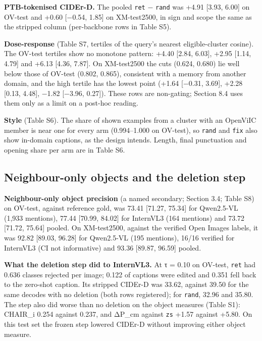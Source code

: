 \textbf{PTB-tokenised CIDEr-D.} The pooled \texttt{ret} − \texttt{rand} was +4.91 {[}3.93, 6.00{]}
on OV-test and +0.60 {[}−0.54, 1.85{]} on XM-test2500, in sign and scope the same as the stripped
column (per-backbone rows in Table S5).

\textbf{Dose-response} (Table S7, tertiles of the query's nearest eligible-cluster cosine). The
OV-test tertiles show no monotone pattern: +4.40 {[}2.84, 6.03{]}, +2.95 {[}1.14, 4.79{]} and +6.13
{[}4.36, 7.87{]}. On XM-test2500 the cuts (0.624, 0.680) lie well below those of OV-test (0.802,
0.865), consistent with a memory from another domain, and the high tertile has the lowest point
(+1.64 {[}−0.31, 3.69{]}, +2.28 {[}0.13, 4.48{]}, −1.82 {[}−3.96, 0.27{]}). These rows are
non-gating; Section 8.4 uses them only as a limit on a post-hoc reading.

\textbf{Style} (Table S6). The share of shown examples from a cluster with an OpenViIC member is
near one for every arm (0.994--1.000 on OV-test), so \texttt{rand} and \texttt{fix} also show
in-domain captions, as the design intends. Length, final punctuation and opening share per arm are
in Table S6.

\subsection{Neighbour-only objects and the deletion
step}\label{neighbour-only-objects-and-the-deletion-step-1}

\textbf{Neighbour-only object precision} (a named secondary; Section 3.4; Table S8) on OV-test,
against reference gold, was 73.41 {[}71.27, 75.34{]} for Qwen2.5-VL (1,933 mentions), 77.44
{[}70.99, 84.02{]} for InternVL3 (164 mentions) and 73.72 {[}71.72, 75.64{]} pooled. On XM-test2500,
against the verified Open Images labels, it was 92.82 {[}89.03, 96.28{]} for Qwen2.5-VL (195
mentions), 16/16 verified for InternVL3 (CI not informative) and 93.36 {[}89.87, 96.59{]} pooled.

\textbf{What the deletion step did to InternVL3.} At τ = 0.10 on OV-test, \texttt{ret} had 0.636
classes rejected per image; 0.122 of captions were edited and 0.351 fell back to the zero-shot
caption. Its stripped CIDEr-D was 33.62, against 39.50 for the same decodes with no deletion (both
rows registered); for \texttt{rand}, 32.96 and 35.80. The step also did worse than no deletion on
the object measures (Table S1): CHAIR\_i 0.254 against 0.237, and ΔP\_cm against \texttt{zs} +1.57
against +5.80. On this test set the frozen step lowered CIDEr-D without improving either object
measure.

